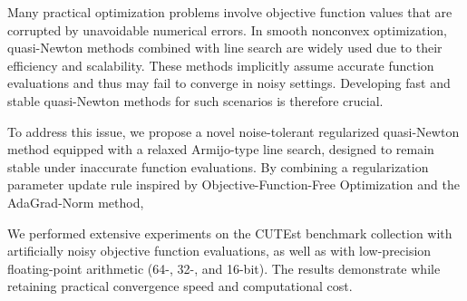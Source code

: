 Many practical optimization problems involve objective function values that are corrupted by unavoidable numerical errors.
In smooth nonconvex optimization, quasi-Newton methods combined with line search are widely used due to their efficiency and scalability.
These methods implicitly assume accurate function evaluations and thus may fail to converge in noisy settings.
Developing fast and stable quasi-Newton methods for such scenarios is therefore crucial.

To address this issue, we propose a novel noise-tolerant regularized quasi-Newton method equipped with a relaxed Armijo-type line search, designed to remain stable under inaccurate function evaluations.
By combining a regularization parameter update rule inspired by Objective-Function-Free Optimization and the AdaGrad-Norm method, 

We performed extensive experiments on the CUTEst benchmark collection with artificially noisy objective function evaluations, as well as with low-precision floating-point arithmetic (64-, 32-, and 16-bit).
The results demonstrate  while retaining practical convergence speed and computational cost.
